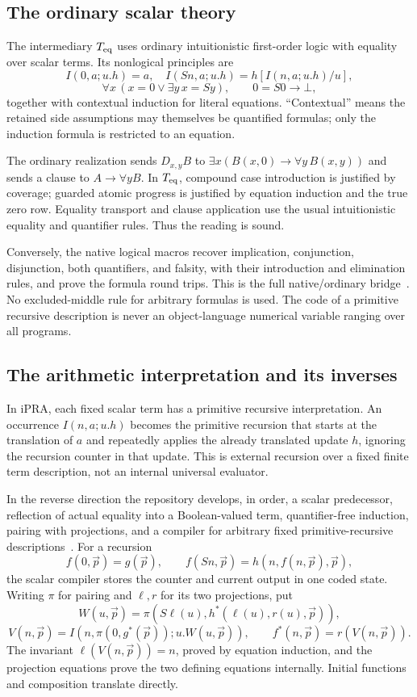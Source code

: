 \subsection{The ordinary scalar theory}

The intermediary $T_{\rm eq}$ uses ordinary intuitionistic first-order logic
with equality over scalar terms. Its nonlogical principles are
\[
 I(0,a;u.h)=a,\quad I(Sn,a;u.h)=h[I(n,a;u.h)/u],
\]
\[
 \forall x\,(x=0\lor\exists y\,x=Sy),\qquad 0=S0\to\bot,
\]
together with contextual induction for literal equations. ``Contextual''
means the retained side assumptions may themselves be quantified formulas;
only the induction formula is restricted to an equation.

The ordinary realization sends $D_{x,y}B$ to
$\exists x(B(x,0)\to\forall y\,B(x,y))$ and sends a clause to
$A\to\forall y B$. In $T_{\rm eq}$, compound case introduction is justified
by coverage; guarded atomic progress is justified by equation induction and
the true zero row. Equality transport and clause application use the usual
intuitionistic equality and quantifier rules. Thus the reading is sound.

Conversely, the native logical macros recover implication, conjunction,
disjunction, both quantifiers, and falsity, with their introduction and
elimination rules, and prove the formula round trips. This is the
full native/ordinary bridge~\cite{choice,ordinary,lean}. No excluded-middle
rule for arbitrary formulas is used. The code of a primitive recursive
description is never an object-language numerical variable ranging over
all programs.

\subsection{The arithmetic interpretation and its inverses}

In iPRA, each fixed scalar term has a primitive recursive interpretation.
An occurrence $I(n,a;u.h)$ becomes the primitive recursion that starts at the
translation of $a$ and repeatedly applies the already translated update $h$,
ignoring the recursion counter in that update. This is external recursion
over a fixed finite term description, not an internal universal evaluator.

In the reverse direction the repository develops, in order, a scalar
predecessor, reflection of actual equality into a Boolean-valued term,
quantifier-free induction, pairing with projections, and a compiler for
arbitrary fixed primitive-recursive descriptions~\cite{arithmetic}.
For a recursion
\[
 f(0,\vec p)=g(\vec p),\qquad
 f(Sn,\vec p)=h(n,f(n,\vec p),\vec p),
\]
the scalar compiler stores the counter and current output in one coded state.
Writing $\pi$ for pairing and $\ell,r$ for its two projections, put
\[
 W(u,\vec p)=\pi(S\ell(u),h^*(\ell(u),r(u),\vec p)),
\]
\[
 V(n,\vec p)=I(n,\pi(0,g^*(\vec p));u.W(u,\vec p)),
 \qquad f^*(n,\vec p)=r(V(n,\vec p)).
\]
The invariant $\ell(V(n,\vec p))=n$, proved by equation induction,
and the projection equations prove the two defining equations internally.
Initial functions and composition translate directly.

